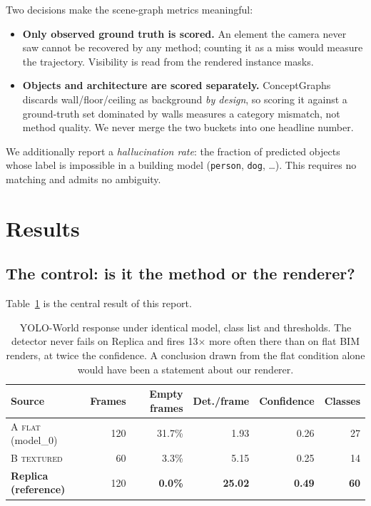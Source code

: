 \documentclass[11pt,a4paper]{article}
\begin{document}
Two decisions make the scene-graph metrics meaningful:

\begin{itemize}
\item \textbf{Only observed ground truth is scored.} An element the camera never
saw cannot be recovered by any method; counting it as a miss would measure the
trajectory. Visibility is read from the rendered instance masks.
\item \textbf{Objects and architecture are scored separately.} ConceptGraphs
discards wall/floor/ceiling as background \emph{by design}, so scoring it against
a ground-truth set dominated by walls measures a category mismatch, not method
quality. We never merge the two buckets into one headline number.
\end{itemize}

We additionally report a \emph{hallucination rate}: the fraction of predicted
objects whose label is impossible in a building model (\texttt{person},
\texttt{dog}, \dots). This requires no matching and admits no ambiguity.

\section{Results}

\subsection{The control: is it the method or the renderer?}
\label{sec:control}

Table~\ref{tab:probe} is the central result of this report.

\begin{table}[h]
\centering
\small
\begin{tabular}{@{}lrrrrr@{}}
\toprule
\textbf{Source} & \textbf{Frames} & \textbf{Empty frames} &
\textbf{Det./frame} & \textbf{Confidence} & \textbf{Classes} \\
\midrule
A \textsc{flat} (model\_0)   & 120 & 31.7\% & 1.93 & 0.26 & 27 \\
B \textsc{textured}        &  60 &  3.3\% & 5.15 & 0.25 & 14 \\
\midrule
\textbf{Replica (reference)} & 120 & \textbf{0.0\%} & \textbf{25.02} &
\textbf{0.49} & \textbf{60} \\
\bottomrule
\end{tabular}
\caption{YOLO-World response under identical model, class list and thresholds.
The detector never fails on Replica and fires 13$\times$ more often there than
on flat BIM renders, at twice the confidence. A conclusion drawn from the flat
condition alone would have been a statement about our renderer.}
\label{tab:probe}
\end{table}
\end{document}
